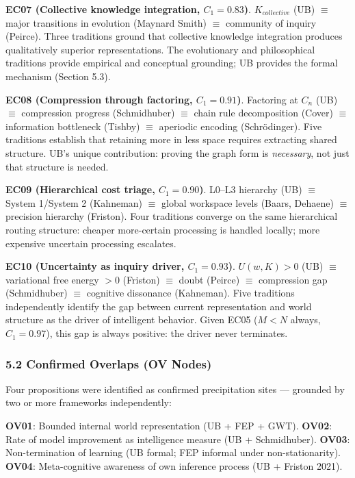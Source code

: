 \documentclass[
]{article}
\begin{document}
\textbf{EC07 (Collective knowledge integration, \(C_1 = 0.83\))}.
\(K_{collective}\) (UB) \(\equiv\) major transitions in evolution
(Maynard Smith) \(\equiv\) community of inquiry (Peirce). Three
traditions ground that collective knowledge integration produces
qualitatively superior representations. The evolutionary and
philosophical traditions provide empirical and conceptual grounding; UB
provides the formal mechanism (Section 5.3).

\textbf{EC08 (Compression through factoring, \(C_1 = 0.91\))}. Factoring
at \(C_n\) (UB) \(\equiv\) compression progress (Schmidhuber) \(\equiv\)
chain rule decomposition (Cover) \(\equiv\) information bottleneck
(Tishby) \(\equiv\) aperiodic encoding (Schrödinger). Five traditions
establish that retaining more in less space requires extracting shared
structure. UB's unique contribution: proving the graph form is
\emph{necessary}, not just that structure is needed.

\textbf{EC09 (Hierarchical cost triage, \(C_1 = 0.90\))}. L0--L3
hierarchy (UB) \(\equiv\) System 1/System 2 (Kahneman) \(\equiv\) global
workspace levels (Baars, Dehaene) \(\equiv\) precision hierarchy
(Friston). Four traditions converge on the same hierarchical routing
structure: cheaper more-certain processing is handled locally; more
expensive uncertain processing escalates.

\textbf{EC10 (Uncertainty as inquiry driver, \(C_1 = 0.93\))}.
\(U(w,K) > 0\) (UB) \(\equiv\) variational free energy \(> 0\) (Friston)
\(\equiv\) doubt (Peirce) \(\equiv\) compression gap (Schmidhuber)
\(\equiv\) cognitive dissonance (Kahneman). Five traditions
independently identify the gap between current representation and world
structure as the driver of intelligent behavior. Given EC05 (\(M < N\)
always, \(C_1 = 0.97\)), this gap is always positive: the driver never
terminates.

\subsubsection{5.2 Confirmed Overlaps (OV
Nodes)}\label{confirmed-overlaps-ov-nodes}

Four propositions were identified as confirmed precipitation sites ---
grounded by two or more frameworks independently:

\textbf{OV01}: Bounded internal world representation (UB + FEP + GWT).
\textbf{OV02}: Rate of model improvement as intelligence measure (UB +
Schmidhuber). \textbf{OV03}: Non-termination of learning (UB formal; FEP
informal under non-stationarity). \textbf{OV04}: Meta-cognitive
awareness of own inference process (UB + Friston 2021).
\end{document}
